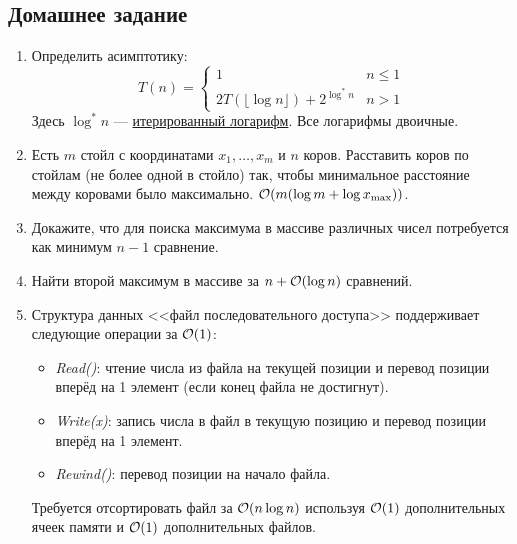 \subsection{Домашнее задание}
\begin{enumerate}
  \item 
	Определить асимптотику:
	$$T(n) =
	  \begin{cases}
	    1 & n \le 1 \\
	    2 T(\lfloor \log n \rfloor) + 2^{\log^* n} & n > 1
	  \end{cases}
	$$
	Здесь $\log^* n$ --- \href{https://en.wikipedia.org/wiki/Iterated_logarithm}{итерированный логарифм}.
	Все логарифмы двоичные.

  \item 
	Есть $m$ стойл с координатами $x_1, \ldots, x_m$ и $n$ коров. Расставить коров по стойлам
	(не более одной в стойло) так, чтобы минимальное расстояние между коровами было максимально.
	$\mathcal{O}(m (\log{m} + \log{x_{\max}}))$.

  \item
    Докажите, что для поиска максимума в массиве различных чисел потребуется
	как минимум $n-1$ сравнение.

  \item
	Найти второй максимум в массиве за $n + \mathcal{O}(\log n)$ сравнений.	

  \item
	Структура данных <<файл последовательного доступа>>
	поддерживает следующие операции за $\mathcal{O}(1)$:
	\begin{itemize}
		\item \emph{Read()}: чтение числа из файла на текущей
		позиции и перевод позиции вперёд на 1 элемент (если конец файла не достигнут).
		\item \emph{Write(x)}: запись числа в файл в текущую
		позицию и перевод позиции вперёд на 1 элемент.
		\item \emph{Rewind()}: перевод позиции на начало файла.
	\end{itemize}

	Требуется отсортировать файл за $\mathcal{O}(n \log{n})$ используя
	$\mathcal{O}(1)$ дополнительных ячеек памяти и $\mathcal{O}(1)$ дополнительных файлов.




\end{enumerate}
